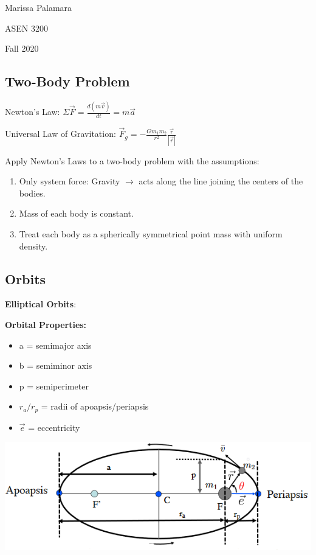 \documentclass{article}
\begin{document}
\begin{multicols*}{3}
    Marissa Palamara\par 
    ASEN 3200\par 
    Fall 2020
    \vspace{-0.5cm}

    \subsection*{Two-Body Problem}
    Newton's Law: $\Sigma \vec{F}=\frac{d(m\vec{v})}{dt}=m\vec{a}$ \par
    Universal Law of Gravitation: $\vec{F}_g=-\frac{Gm_1m_2}{r^2}\frac{\vec{r}}{|\vec{r}|}$\par 
    Apply Newton's Laws to a two-body problem with the assumptions:
    \begin{enumerate}
        \itemsep0em
        \item Only system force: Gravity $\rightarrow$ acts along the line joining the centers of the bodies.
        \item Mass of each body is constant.
        \item Treat each body as a spherically symmetrical point mass with uniform density.
    \end{enumerate}
    \subsection*{Orbits}
    \textbf{Elliptical Orbits}:\par
    \textbf{Orbital Properties:}
    \begin{itemize}
        \itemsep0em
        \item a = semimajor axis
        \item b = semiminor axis
        \item p = semiperimeter
        \item $r_a/r_p$ = radii of apoapsis/periapsis
        \item $\vec{e}$ = eccentricity
    \end{itemize}
    \includegraphics[width=\linewidth]{Figures/orbital_properties.png}


\end{multicols*}
\end{document}
